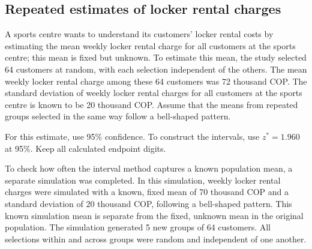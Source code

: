 \subsection{Repeated estimates of locker rental charges}
\label{prob:c2-1}

A sports centre wants to understand its customers' locker rental costs by estimating the mean weekly locker rental charge for all customers at the sports centre; this mean is fixed but unknown. To estimate this mean, the study selected 64 customers at random, with each selection independent of the others. The mean weekly locker rental charge among these 64 customers was 72 thousand COP. The standard deviation of weekly locker rental charges for all customers at the sports centre is known to be 20 thousand COP. Assume that the means from repeated groups selected in the same way follow a bell-shaped pattern.

For this estimate, use 95\% confidence. To construct the intervals, use $z^*=1.960$ at 95\%. Keep all calculated endpoint digits.

To check how often the interval method captures a known population mean, a separate simulation was completed. In this simulation, weekly locker rental charges were simulated with a known, fixed mean of 70 thousand COP and a standard deviation of 20 thousand COP, following a bell-shaped pattern. This known simulation mean is separate from the fixed, unknown mean in the original population. The simulation generated 5 new groups of 64 customers. All selections within and across groups were random and independent of one another.


